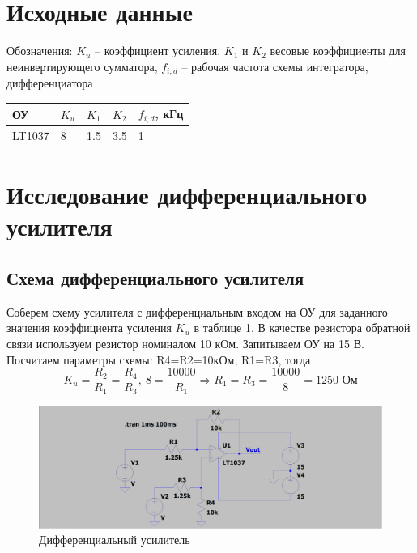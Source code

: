 \documentclass[a4paper, 12pt]{article}
\begin{document}
    \section{Исходные данные}
    Обозначения: $K_u$ -- коэффициент усиления, $K_1$ и $K_2$ весовые коэффициенты для неинвертирующего сумматора,
    $f_{i,d}$ -- рабочая частота схемы интегратора, дифференциатора
    \begin{center}
        \begin{tabular}{ | m{4em} | m{4em}| m{4em} | m{4em} | m{4em} | } 
        \hline
        ОУ& $K_u$ &$K_1$ &$K_2$ &$f_{i,d}$, кГц\\ 
        \hline
        LT1037& 8 & 1.5 &3.5 &1\\ 
        \hline
        \end{tabular}
    \end{center}


    \section{Исследование дифференциального усилителя}
    \subsection{Схема дифференциального усилителя}
    Соберем схему усилителя с дифференциальным входом на ОУ
    для заданного значения коэффициента усиления $K_u$ в таблице 1.
    В качестве резистора обратной связи используем резистор номиналом 10 кОм.
    Запитываем ОУ на 15 В. Посчитаем параметры схемы: R4=R2=10кОм, R1=R3, тогда
    $$
    K_u=\dfrac{R_2}{R_1}=\dfrac{R_4}{R_3},\ 8=\dfrac{10000}{R_1}\Rightarrow R_1=R_3=\dfrac{10000}{8}=1250\text{ Ом}
    $$
    \begin{figure}[H]
        \centering
        \includegraphics[scale=0.22]{scheme1.png}
        \captionsetup{skip=0pt}
        \caption{Дифференциальный усилитель}
        \label{fig:scheme1}
    \end{figure}
\end{document}
